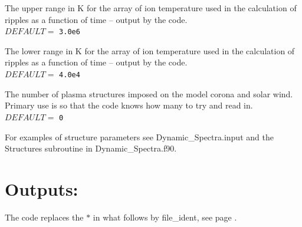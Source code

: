 \documentclass[12pt,a4paper]{article}
\begin{document}
  \vspace{0.5cm}

  \setlength{\temptextwidth}{\textwidth} 
  \addtolength{\temptextwidth}{-1.0\parindent} 
    
    \parbox[t]{\temptextwidth}{The upper range in K for the array of ion 
                               temperature used in the calculation of ripples 
                               as a function of time -- output by the  code. \\ 
                               $DEFAULT=$ {\tt 3.0e6}} 

  \vspace{0.5cm}

  \setlength{\temptextwidth}{\textwidth} 
  \addtolength{\temptextwidth}{-1.0\parindent} 
    
    \parbox[t]{\temptextwidth}{The lower range in K for the array of ion 
                               temperature used in the calculation of ripples 
                               as a function of time -- output by the  code. \\ 
                               $DEFAULT=$ {\tt 4.0e4}}

  \vspace{0.5cm}

  \setlength{\temptextwidth}{\textwidth}  
  \addtolength{\temptextwidth}{-1.0\parindent} 
    
    \parbox[t]{\temptextwidth}{The number of plasma structures imposed on 
                               the model corona and solar wind. Primary use 
                               is so that the code knows how many to try and 
                               read in. \\ 
                               $DEFAULT=$ {\tt 0}}

 \vspace{0.5cm}       

\noindent For examples of structure parameters see Dynamic\_Spectra.input and the
Structures subroutine in Dynamic\_Spectra.f90.

\newpage

\section{Outputs:}\label{AppB:outputs}   
The code replaces the $\ast$ in what follows by file\_ident, see page \pageref{AppB:inputs}. 
\end{document}
